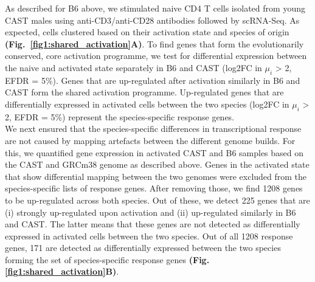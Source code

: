 As described for B6 above, we stimulated naive CD4\plus{} T cells isolated from young CAST males using anti-CD3\textepsilon{}/anti-CD28 antibodies followed by scRNA-Seq. As expected, cells clustered based on their activation state and species of origin \textbf{(Fig.~\ref{fig1:shared_activation}A)}. To find genes that form the evolutionarily conserved, core activation programme, we test for differential expression between the naive and activated state separately in B6 and CAST (log2FC in $\mu_i$ > 2, EFDR = 5\%). Genes that are up-regulated after activation similarly in B6 and CAST form the shared activation programme. Up-regulated genes that are differentially expressed in activated cells between the two species (log2FC in $\mu_i$ > 2, EFDR = 5\%) represent the species-specific response genes. \\

We next ensured that the species-specific differences in transcriptional response are not caused by mapping artefacts between the different genome builds. For this, we quantified gene expression in activated CAST and B6 samples based on the CAST and GRCm38 genome as described above. Genes in the activated state that show differential mapping between the two genomes were excluded from the species-specific lists of response genes. After removing those, we find 1208 genes to be up-regulated across both species. Out of these, we detect 225 genes that are (i) strongly up-regulated upon activation and (ii) up-regulated similarly in B6 and CAST. The latter means that these genes are not detected as differentially expressed in activated cells between the two species. Out of all 1208 response genes, 171 are detected as differentially expressed between the two species forming the set of species-specific response genes \textbf{(Fig. \ref{fig1:shared_activation}B)}.

\newpage

